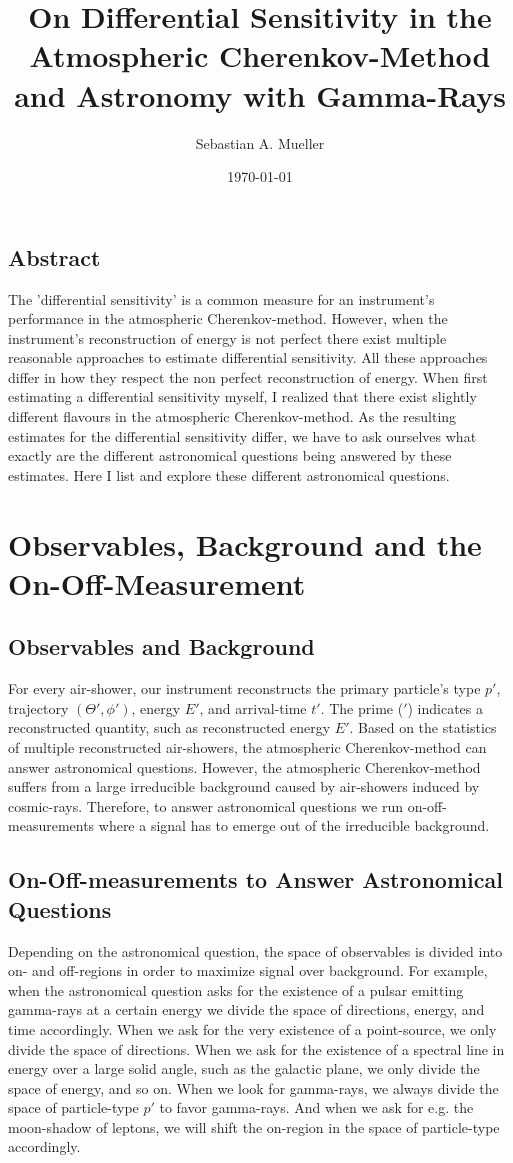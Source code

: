 \documentclass{article}%
\title{
    On Differential Sensitivity in the Atmospheric Cherenkov-Method and Astronomy with Gamma-Rays
}%
\author{Sebastian A. Mueller}%
\date{\today{}}%
\begin{document}
%
\maketitle%
%
\newcommand{\dd}[2]{\frac{\mathrm{d}#1}{\mathrm{d}#2}}
%
\subsection*{Abstract}
The 'differential sensitivity' is a common measure for an instrument's performance in the atmospheric Cherenkov-method.
%
However, when the instrument's reconstruction of energy is not perfect there exist multiple reasonable approaches to estimate differential sensitivity.
%
All these approaches differ in how they respect the non perfect reconstruction of energy.
%
When first estimating a differential sensitivity myself, I realized that there exist slightly different flavours in the atmospheric Cherenkov-method.
%
As the resulting estimates for the differential sensitivity differ, we have to ask ourselves what exactly are the different astronomical questions being answered by these estimates.
%
Here I list and explore these different astronomical questions.
%
\section{Observables, Background and the On-Off-Measurement}
\label{SecObservablesAndOnOff}
\subsection*{Observables and Background}
%
For every air-shower, our instrument reconstructs the primary particle's type $p'$, trajectory $(\Theta', \phi')$, energy $E'$, and arrival-time $t'$.
%
The prime ($'$) indicates a reconstructed quantity, such as reconstructed energy $E'$.
%
Based on the statistics of multiple reconstructed air-showers, the atmospheric Cherenkov-method can answer astronomical questions.
%
However, the atmospheric Cherenkov-method suffers from a large irreducible background caused by air-showers induced by cosmic-rays.
%
Therefore, to answer astronomical questions we run on-off-measurements where a signal has to emerge out of the irreducible background.
%
\subsection*{On-Off-measurements to Answer Astronomical Questions}
Depending on the astronomical question, the space of observables is divided into on- and off-regions in order to maximize signal over background.
%
For example, when the astronomical question asks for the existence of a pulsar emitting gamma-rays at a certain energy we divide the space of directions, energy, and time accordingly.
%
When we ask for the very existence of a point-source, we only divide the space of directions.
%
When we ask for the existence of a spectral line in energy over a large solid angle, such as the galactic plane, we only divide the space of energy, and so on.
%
When we look for gamma-rays, we always divide the space of particle-type $p'$ to favor gamma-rays.
%
And when we ask for e.g. the moon-shadow of leptons, we will shift the on-region in the space of particle-type accordingly.
%
\end{document}
